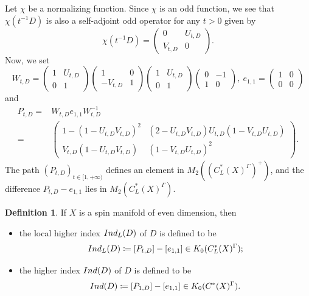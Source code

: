 \documentclass[12pt, reqno]{amsart}
\theoremstyle{plain}%
\theoremstyle{definition}
\newtheorem{definition}[theorem]{Definition}
\theoremstyle{remark}
\numberwithin{equation}{section}
\newcommand{\ind}{\textup{Ind}}
\begin{document}
Let $\chi$ be a normalizing function. Since  $\chi$ is an odd function, we see that $\chi(t^{-1}D)$ is also a self-adjoint odd operator for any $t>0$ given by
\begin{equation}\label{eq:chi}
	\chi(t^{-1} D)=\begin{pmatrix}
		0&U_{t,D}\\V_{t,D}&0
	\end{pmatrix}.
\end{equation}
Now, we set
$$W_{t,D}=\begin{pmatrix}
	1& U_{t,D}\\0&1
\end{pmatrix}
\begin{pmatrix}
	1&0\\-V_{t,D}&1
\end{pmatrix}
\begin{pmatrix}
	1&U_{t,D}\\0&1
\end{pmatrix}
\begin{pmatrix}
	0&-1\\1&0
\end{pmatrix},\ e_{1,1}=\begin{pmatrix}
	1&0\\0&0
\end{pmatrix}
$$
and
\begin{equation}\label{eq:PtD}
	\begin{split}
		P_{t,D} = & W_{t,D}e_{1,1}W_{t,D}^{-1}\\
		= & \begin{pmatrix}
			1-(1-U_{t,D}V_{t,D})^2 & (2-U_{t,D}V_{t,D})U_{t,D}(1-V_{t,D}U_{t,D})\\
			V_{t,D}(1-U_{t,D}V_{t,D})&(1-V_{t,D}U_{t,D})^2
		\end{pmatrix}.
	\end{split}
\end{equation}
The path $(P_{t,D})_{t\in[1,+\infty)}$ defines an element in  $M_2((C^*_L(X)^\Gamma)^+)$, and the difference $P_{t,D}-e_{1,1}$ lies in $M_2(C^*_L(X)^\Gamma)$.
\begin{definition}\label{def:lind}
	If $X$ is a  spin manifold of even dimension, then  
	\begin{itemize}
		\item 	the local higher index $\ind_L(D)$ of $D$ is defined to be  
		\[ \ind_L(D)\coloneqq [P_{t,D}]-[e_{1,1}] \in K_0(C^*_L(X)^\Gamma); \] 
		\item 
		the higher index $\ind(D)$ of $D$ is defined to be  
		\[ \ind(D) \coloneqq [P_{1,D}]-[e_{1,1}] \in  K_0(C^*(X)^\Gamma).\]
	\end{itemize}
	
	

\end{definition}
\end{document}
